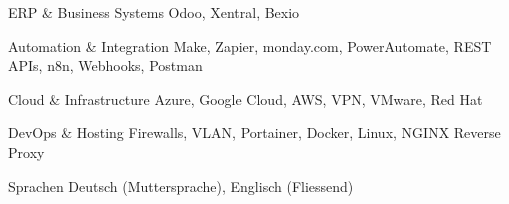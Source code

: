 

\begin{cvskills}
    \cvskill
    {ERP \& Business Systems}
    {Odoo, Xentral, Bexio}

  \cvskill
    {Automation \& Integration}
    {Make, Zapier, monday.com, PowerAutomate, REST APIs, n8n, Webhooks, Postman}

  \cvskill
    {Cloud \& Infrastructure}
    {Azure, Google Cloud, AWS, VPN, VMware, Red Hat}

  \cvskill
    {DevOps \& Hosting}
    {Firewalls, VLAN, Portainer, Docker, Linux, NGINX Reverse Proxy}

  \cvskill
    {Sprachen}
    {Deutsch (Muttersprache), Englisch (Fliessend)}
\end{cvskills}
